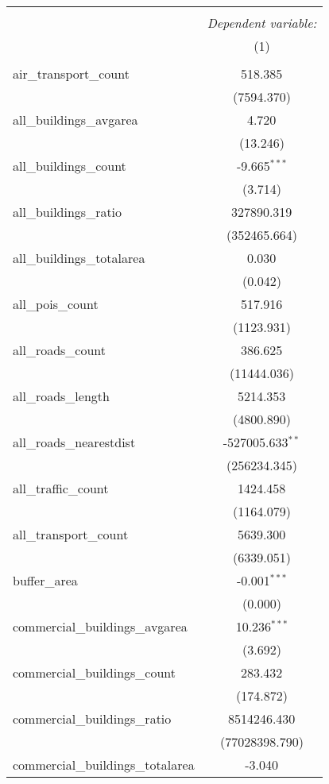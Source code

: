 \begin{table}[!htbp] \centering
\begin{tabular}{@{\extracolsep{5pt}}lc}
\\[-1.8ex]\hline
\hline \\[-1.8ex]
& \multicolumn{1}{c}{\textit{Dependent variable:}} \
\cr \cline{1-2}
\\[-1.8ex] & (1) \\
\hline \\[-1.8ex]
 air_transport_count & 518.385$^{}$ \\
  & (7594.370) \\
 all_buildings_avgarea & 4.720$^{}$ \\
  & (13.246) \\
 all_buildings_count & -9.665$^{***}$ \\
  & (3.714) \\
 all_buildings_ratio & 327890.319$^{}$ \\
  & (352465.664) \\
 all_buildings_totalarea & 0.030$^{}$ \\
  & (0.042) \\
 all_pois_count & 517.916$^{}$ \\
  & (1123.931) \\
 all_roads_count & 386.625$^{}$ \\
  & (11444.036) \\
 all_roads_length & 5214.353$^{}$ \\
  & (4800.890) \\
 all_roads_nearestdist & -527005.633$^{**}$ \\
  & (256234.345) \\
 all_traffic_count & 1424.458$^{}$ \\
  & (1164.079) \\
 all_transport_count & 5639.300$^{}$ \\
  & (6339.051) \\
 buffer_area & -0.001$^{***}$ \\
  & (0.000) \\
 commercial_buildings_avgarea & 10.236$^{***}$ \\
  & (3.692) \\
 commercial_buildings_count & 283.432$^{}$ \\
  & (174.872) \\
 commercial_buildings_ratio & 8514246.430$^{}$ \\
  & (77028398.790) \\
 commercial_buildings_totalarea & -3.040$^{}$ \\

\end{tabular}
\end{table}

